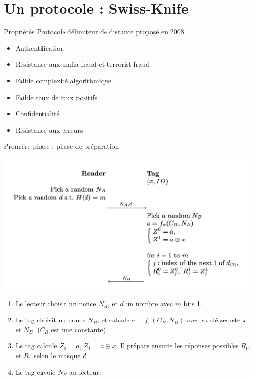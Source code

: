 \documentclass[aspectratio=169]{beamer}
\begin{document}
\section{Un protocole : Swiss-Knife}

\begin{frame}{Propriétés}
  Protocole délimiteur de distance proposé en 2008. \cite{SwissKnife}

  \bigskip

  \begin{itemize}
    \item Authentification
    \item Résistance aux mafia fraud et terrorist fraud
    \item Faible complexité algorithmique
    \item Faible taux de faux positifs
    \item Confidentialité
    \item Résistance aux erreurs
  \end{itemize}

\end{frame}


\begin{frame}{Première phase : phase de préparation}
  \begin{multicols}{2}
    \begin{minipage}[c]{\linewidth}
      \centering
      \bigskip
      \medskip
      \includegraphics[width=\linewidth]{assets/sk-phase1.png}
    \end{minipage}

    \begin{minipage}[t]{\linewidth}
      \begin{enumerate}
        \item Le lecteur choisit un nonce $N_A$, et $d$ un nombre avec $m$ bits 1.
        \item Le tag choisit un nonce $N_B$, et calcule $a = f_x(C_B, N_B)$ avec sa clé secrète $x$ et $N_B$. ($C_B$ est une constante)
        \item Le tag calcule $Z_0 = a$, $Z_1 = a \oplus x$. Il prépare ensuite les réponses possibles $R_0$ et $R_1$ selon le masque $d$.
        \item Le tag envoie $N_B$ au lecteur.
      \end{enumerate}
    \end{minipage}
  \end{multicols}
\end{frame}
\end{document}
